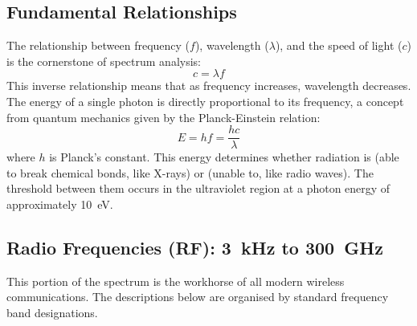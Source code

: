 \subsection{Fundamental Relationships}

The relationship between frequency ($f$), wavelength ($\lambda$), and the speed of light ($c$) is the cornerstone of spectrum analysis:
\begin{equation}
    c = \lambda f
    \label{eq:wavelength}
\end{equation}
This inverse relationship means that as frequency increases, wavelength decreases. The energy of a single photon is directly proportional to its frequency, a concept from quantum mechanics given by the Planck-Einstein relation:
\begin{equation}
    E = h f = \frac{hc}{\lambda}
\end{equation}
where $h$ is Planck's constant. This energy determines whether radiation is  (able to break chemical bonds, like X-rays) or  (unable to, like radio waves). The threshold between them occurs in the ultraviolet region at a photon energy of approximately \SI{10}{eV}.

\subsection{Radio Frequencies (RF): \qty{3}{kHz} to \qty{300}{GHz}}
This portion of the spectrum is the workhorse of all modern wireless communications. The descriptions below are organised by standard frequency band designations.

